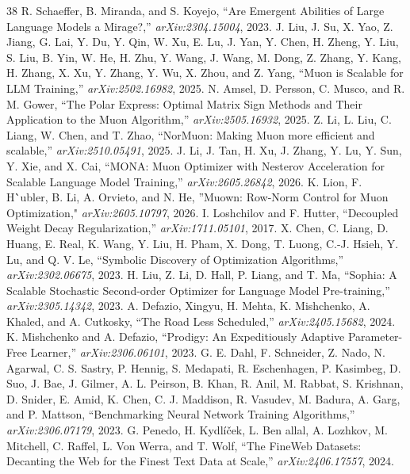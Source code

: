 \begin{thebibliography}{38}
 R. Schaeffer, B. Miranda, and S. Koyejo, ``Are Emergent Abilities of Large Language Models a Mirage?,'' \emph{arXiv:2304.15004}, 2023.
 J. Liu, J. Su, X. Yao, Z. Jiang, G. Lai, Y. Du, Y. Qin, W. Xu, E. Lu, J. Yan, Y. Chen, H. Zheng, Y. Liu, S. Liu, B. Yin, W. He, H. Zhu, Y. Wang, J. Wang, M. Dong, Z. Zhang, Y. Kang, H. Zhang, X. Xu, Y. Zhang, Y. Wu, X. Zhou, and Z. Yang, ``Muon is Scalable for LLM Training,'' \emph{arXiv:2502.16982}, 2025.
 N. Amsel, D. Persson, C. Musco, and R. M. Gower, ``The Polar Express: Optimal Matrix Sign Methods and Their Application to the Muon Algorithm,'' \emph{arXiv:2505.16932}, 2025.
 Z. Li, L. Liu, C. Liang, W. Chen, and T. Zhao, ``NorMuon: Making Muon more efficient and scalable,'' \emph{arXiv:2510.05491}, 2025.
 J. Li, J. Tan, H. Xu, J. Zhang, Y. Lu, Y. Sun, Y. Xie, and X. Cai, ``MONA: Muon Optimizer with Nesterov Acceleration for Scalable Language Model Training,'' \emph{arXiv:2605.26842}, 2026.
 K. Lion, F. H\``{u}bler, B. Li, A. Orvieto, and N. He, ''Muown: Row-Norm Control for Muon Optimization," \emph{arXiv:2605.10797}, 2026.
 I. Loshchilov and F. Hutter, ``Decoupled Weight Decay Regularization,'' \emph{arXiv:1711.05101}, 2017.
 X. Chen, C. Liang, D. Huang, E. Real, K. Wang, Y. Liu, H. Pham, X. Dong, T. Luong, C.-J. Hsieh, Y. Lu, and Q. V. Le, ``Symbolic Discovery of Optimization Algorithms,'' \emph{arXiv:2302.06675}, 2023.
 H. Liu, Z. Li, D. Hall, P. Liang, and T. Ma, ``Sophia: A Scalable Stochastic Second-order Optimizer for Language Model Pre-training,'' \emph{arXiv:2305.14342}, 2023.
 A. Defazio, Xingyu, H. Mehta, K. Mishchenko, A. Khaled, and A. Cutkosky, ``The Road Less Scheduled,'' \emph{arXiv:2405.15682}, 2024.
 K. Mishchenko and A. Defazio, ``Prodigy: An Expeditiously Adaptive Parameter-Free Learner,'' \emph{arXiv:2306.06101}, 2023.
 G. E. Dahl, F. Schneider, Z. Nado, N. Agarwal, C. S. Sastry, P. Hennig, S. Medapati, R. Eschenhagen, P. Kasimbeg, D. Suo, J. Bae, J. Gilmer, A. L. Peirson, B. Khan, R. Anil, M. Rabbat, S. Krishnan, D. Snider, E. Amid, K. Chen, C. J. Maddison, R. Vasudev, M. Badura, A. Garg, and P. Mattson, ``Benchmarking Neural Network Training Algorithms,'' \emph{arXiv:2306.07179}, 2023.
 G. Penedo, H. Kydl\'{i}\v{c}ek, L. Ben allal, A. Lozhkov, M. Mitchell, C. Raffel, L. Von Werra, and T. Wolf, ``The FineWeb Datasets: Decanting the Web for the Finest Text Data at Scale,'' \emph{arXiv:2406.17557}, 2024.

\end{thebibliography}
